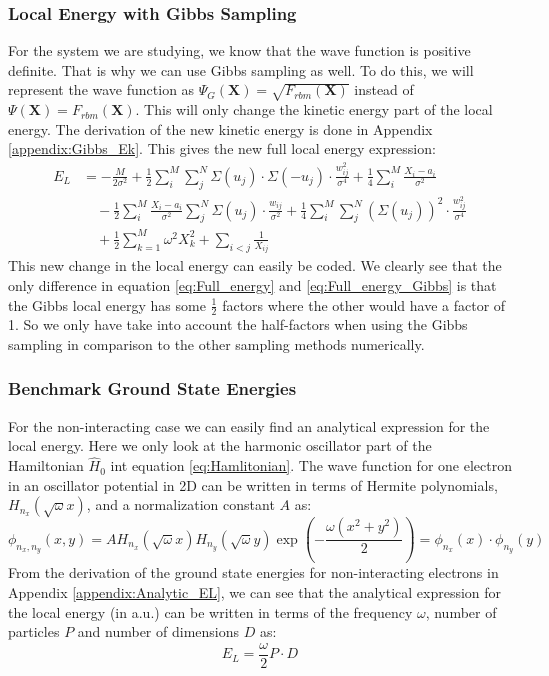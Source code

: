 \documentclass[12pt,a4paper,english]{article}
\begin{document}
\subsubsection{Local Energy with Gibbs Sampling}
\label{subsubsect:Gibbs_EL}
For the system we are studying, we know that the wave function is positive definite. That is why we can use Gibbs sampling as well. To do this, we will represent the wave function as $\Psi_G(\textbf{X})=\sqrt{F_{rbm}(\textbf{X})}$ instead of $\Psi(\textbf{X})=F_{rbm}(\textbf{X})$. This will only change the kinetic energy part of the local energy. The derivation of the new kinetic energy is done in Appendix \ref{appendix:Gibbs_Ek}. This gives the new full local energy expression:
\begin{align}
\label{eq:Full_energy_Gibbs}
E_L&=-\frac{M}{2\sigma^2} +\frac{1}{2}\sum_{i}^{M}\sum_{j}^{N}\Sigma(u_j)\cdot\Sigma(-u_j)\cdot\frac{w_{ij}^2}{\sigma^4} +\frac{1}{4}\sum_{i}^{M}\frac{X_i-a_i}{\sigma^2}\nonumber\\ 
&\quad -\frac{1}{2}\sum_{i}^{M}\frac{X_i-a_i}{\sigma^2}\sum_{j}^{N}\Sigma(u_j)\cdot\frac{w_{ij}}{\sigma^2} 
+\frac{1}{4}\sum_{i}^{M}\sum_{j}^{N}(\Sigma(u_j))^2\cdot\frac{w_{ij}^2}{\sigma^4}\nonumber\\
&\quad +\frac{1}{2}\sum_{k=1}^{M}\omega^2X_k^2 + \sum_{i<j}\frac{1}{X_{ij}}
\end{align}
This new change in the local energy can easily be coded. We clearly see that the only difference in equation \ref{eq:Full_energy} and \ref{eq:Full_energy_Gibbs} is that the Gibbs local energy has some $\frac{1}{2}$ factors where the other would have a factor of 1. So we only have take into account the half-factors when using the Gibbs sampling in comparison to the other sampling methods numerically.

\subsubsection{Benchmark Ground State Energies}
\label{subsubsect:Analytical E_L}
For the non-interacting case we can easily find an analytical expression for the local energy. Here we only look at the harmonic oscillator part of the Hamiltonian $\hat{H}_0$ int equation \ref{eq:Hamlitonian}. The wave function for one electron in an oscillator potential in 2D can be written in terms of Hermite polynomials, $H_{n_x}(\sqrt{\omega}x)$, and a normalization constant $A$ as:
\begin{equation}
\label{eq:simple_wf}
\phi_{n_x,n_y}(x,y)=AH_{n_x}(\sqrt{\omega}x)H_{n_y}(\sqrt{\omega}y)\exp\left(-\frac{\omega(x^2+y^2)}{2}\right)=\phi_{n_x}(x)\cdot\phi_{n_y}(y)
\end{equation}
From the derivation of the ground state energies for non-interacting electrons in Appendix \ref{appendix:Analytic_EL}, we can see that the analytical expression for the local energy (in a.u.) can be written in terms of the frequency $\omega$, number of particles $P$ and number of dimensions $D$ as:
\begin{equation}
\label{eq:analytic_EL}
E_L=\frac{\omega}{2}P\cdot D
\end{equation}
\end{document}
